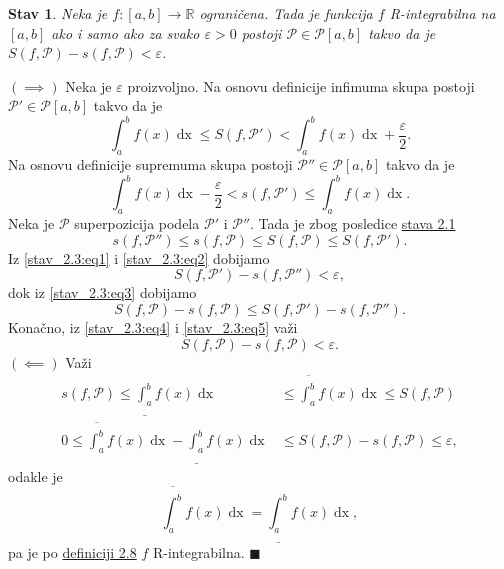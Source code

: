 \documentclass{article}
\newtheorem{stav}{Stav}[section]
\DeclareMathOperator{\dx}{dx}
\begin{document}
\begin{stavbox}
    \label{stav_2.3}
    \begin{stav}
        Neka je $f: \left[a,b\right]\longrightarrow\mathbb{R}$ ograničena. Tada je funkcija $f$
        R-integrabilna na $\left[a,b\right]$ ako i samo ako za svako $\varepsilon>0$ postoji
        $\mathcal{P}\in\mathcal{P}\left[a,b\right]$ takvo da je $S\left(f,\mathcal{P}\right)-s\left(f,\mathcal{P}\right)<\varepsilon$.
    \end{stav}
\end{stavbox}
$\left(\implies\right)$ Neka je $\varepsilon$ proizvoljno. Na osnovu definicije infimuma skupa postoji $\mathcal{P}'\in\mathcal{P}\left[a,b\right]$
takvo da je
\begin{equation}
    \label{stav_2.3:eq1}
    \int_{a}^{b}f\left(x\right)\dx\leq S\left(f,\mathcal{P}'\right)<\int_{a}^{b}f\left(x\right)\dx+\frac{\varepsilon}{2}.
\end{equation}
Na osnovu definicije supremuma skupa postoji $\mathcal{P}''\in\mathcal{P}\left[a,b\right]$
takvo da je
\begin{equation}
    \label{stav_2.3:eq2}
    \int_{a}^{b}f\left(x\right)\dx-\frac{\varepsilon}{2}< s\left(f,\mathcal{P}'\right)\leq\int_{a}^{b}f\left(x\right)\dx.
\end{equation}
Neka je $\mathcal{P}$ superpozicija podela $\mathcal{P}'$ i $\mathcal{P}''$. Tada je zbog posledice \hyperref[stav_2.1]{stava 2.1}
\begin{equation}
    \label{stav_2.3:eq3}
    s\left(f,\mathcal{P}''\right)\leq s\left(f,\mathcal{P}\right)\leq S\left(f,\mathcal{P}\right)\leq S\left(f,\mathcal{P}'\right).
\end{equation}
Iz \eqref{stav_2.3:eq1} i \eqref{stav_2.3:eq2} dobijamo
\begin{equation}
    \label{stav_2.3:eq4}
    S\left(f,\mathcal{P}'\right)-s\left(f,\mathcal{P}''\right)<\varepsilon,
\end{equation}
dok iz \eqref{stav_2.3:eq3} dobijamo
\begin{equation}
    \label{stav_2.3:eq5}
    S\left(f,\mathcal{P}\right)-s\left(f,\mathcal{P}\right)\leq S\left(f,\mathcal{P'}\right)-s\left(f,\mathcal{P''}\right).
\end{equation}
Konačno, iz \eqref{stav_2.3:eq4} i \eqref{stav_2.3:eq5} važi
\begin{equation}
    S\left(f,\mathcal{P}\right)-s\left(f,\mathcal{P}\right)<\varepsilon.
\end{equation}
$\left(\impliedby\right)$ Važi
\begin{align*}
    s\left(f,\mathcal{P}\right)\leq\underline{\int_{a}^{b}}f\left(x\right)\dx                 & \leq\overline{\int_{a}^{b}}f\left(x\right)\dx\leq S\left(f,\mathcal{P}\right) \\
    0\leq\overline{\int_{a}^{b}}f\left(x\right)\dx-\underline{\int_{a}^{b}}f\left(x\right)\dx & \leq S\left(f,\mathcal{P}\right)-s\left(f,\mathcal{P}\right)\leq\varepsilon,
\end{align*}
odakle je
$$\overline{\int_{a}^{b}}f\left(x\right)\dx=\underline{\int_{a}^{b}}f\left(x\right)\dx,$$
pa je po \hyperref[definicija_2.8]{definiciji 2.8} $f$ R-integrabilna.
\null\hfill $\blacksquare$\par
\end{document}
